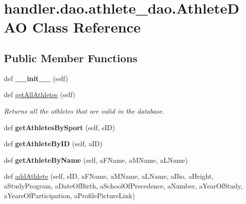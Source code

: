 \hypertarget{classhandler_1_1dao_1_1athlete__dao_1_1_athlete_d_a_o}{}\section{handler.\+dao.\+athlete\+\_\+dao.\+Athlete\+D\+AO Class Reference}
\label{classhandler_1_1dao_1_1athlete__dao_1_1_athlete_d_a_o}
\subsection*{Public Member Functions}
\begin{DoxyCompactItemize}
\item 
\mbox{\label{classhandler_1_1dao_1_1athlete__dao_1_1_athlete_d_a_o_a45e1d4d0fb1e1ab6327de53702dc1cc3}} 
def {\bfseries \+\_\+\+\_\+init\+\_\+\+\_\+} (self)
\item 
def \hyperlink{classhandler_1_1dao_1_1athlete__dao_1_1_athlete_d_a_o_a20c2fea97ed691d3c9459cb8bf13f962}{get\+All\+Athletes} (self)
\begin{DoxyCompactList}\small\item\em Returns all the athletes that are valid in the database. \end{DoxyCompactList}\item 
\mbox{\label{classhandler_1_1dao_1_1athlete__dao_1_1_athlete_d_a_o_a03840784aabb2ecf6fd1117a999cc314}} 
def {\bfseries get\+Athletes\+By\+Sport} (self, s\+ID)
\item 
\mbox{\label{classhandler_1_1dao_1_1athlete__dao_1_1_athlete_d_a_o_a0e7927503dbc9e594eab1b71ccfdcc71}} 
def {\bfseries get\+Athlete\+By\+ID} (self, a\+ID)
\item 
\mbox{\label{classhandler_1_1dao_1_1athlete__dao_1_1_athlete_d_a_o_af6fe068ebb4a70311923168093b79610}} 
def {\bfseries get\+Athlete\+By\+Name} (self, a\+F\+Name, a\+M\+Name, a\+L\+Name)
\item 
def \hyperlink{classhandler_1_1dao_1_1athlete__dao_1_1_athlete_d_a_o_a8d63542ce2b12f1e736ad2dc718b07cd}{add\+Athlete} (self, s\+ID, a\+F\+Name, a\+M\+Name, a\+L\+Name, a\+Bio, a\+Height, a\+Study\+Program, a\+Date\+Of\+Birth, a\+School\+Of\+Precedence, a\+Number, a\+Year\+Of\+Study, a\+Years\+Of\+Participation, a\+Profile\+Picture\+Link)

\end{DoxyCompactItemize}
